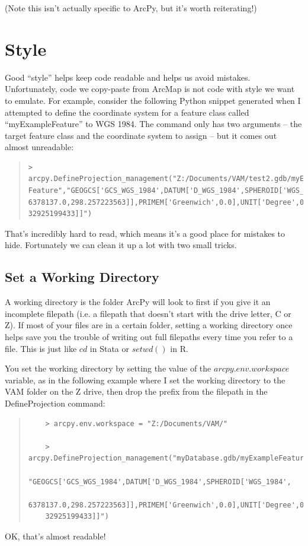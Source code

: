 \documentclass[12pt]{article}
\begin{document}
(Note this isn't actually specific to ArcPy, but it's worth reiterating!)

\section{Style}
Good ``style'' helps keep code readable and helps us avoid mistakes. Unfortunately, code we copy-paste from ArcMap is not code with style we want to emulate. For example, consider the following Python snippet generated when I attempted to define the coordinate system for a feature class called ``myExampleFeature'' to WGS 1984. The command only has two arguments -- the target feature class and the coordinate system to assign -- but it comes out almost unreadable:

\begin{quote}
\begin{verbatim}
> arcpy.DefineProjection_management("Z:/Documents/VAM/test2.gdb/myExample
Feature","GEOGCS['GCS_WGS_1984',DATUM['D_WGS_1984',SPHEROID['WGS_1984',
6378137.0,298.257223563]],PRIMEM['Greenwich',0.0],UNIT['Degree',0.01745
32925199433]]")
\end{verbatim} 
\end{quote}

That's incredibly hard to read, which means it's a good place for mistakes to hide. Fortunately we can clean it up a lot with two small tricks.

\subsection*{\textbf{Set a Working Directory}} 
A working directory is the folder ArcPy will look to first if you give it an incomplete filepath (i.e. a filepath that doesn't start with the drive letter, C or Z). If most of your files are in a certain folder, setting a working directory once helps save you the trouble of writing out full filepaths every time you refer to a file. This is just like $cd$ in Stata or $setwd()$ in R. 

You set the working directory by setting the value of the $arcpy.env.workspace$ variable, as in the following example where I set the working directory to the VAM folder on the Z drive, then drop the prefix from the filepath in the DefineProjection command:   
	\begin{quote}
	\begin{verbatim}
	> arcpy.env.workspace = "Z:/Documents/VAM/"	

	> arcpy.DefineProjection_management("myDatabase.gdb/myExampleFeature",
	"GEOGCS['GCS_WGS_1984',DATUM['D_WGS_1984',SPHEROID['WGS_1984',
	6378137.0,298.257223563]],PRIMEM['Greenwich',0.0],UNIT['Degree',0.01745
	32925199433]]")
	\end{verbatim}
	\end{quote}
OK, that's almost readable!
\end{document}
